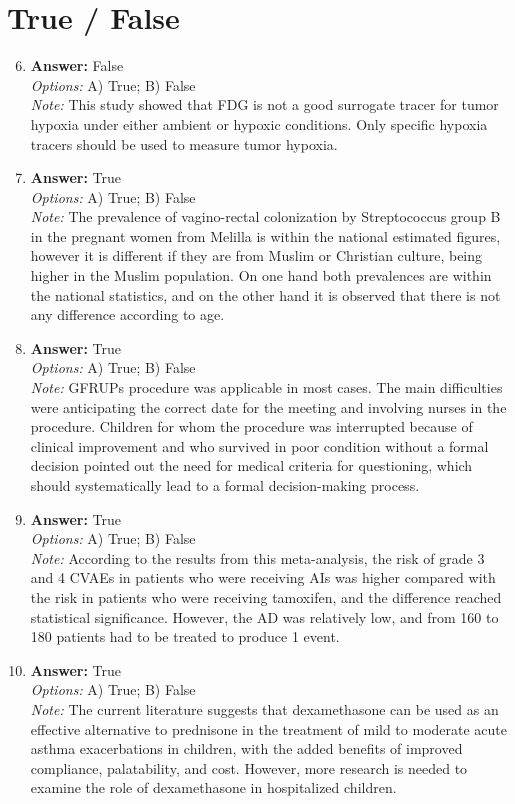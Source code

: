 \documentclass[12pt]{article}
\begin{document}
\section*{True / False}
\begin{enumerate}[label=\arabic*.]
\setcounter{enumi}{5}
\item \textbf{Answer:} False
\\ \textit{Options:} A) True; B) False
\\ \textit{Note:} This study showed that FDG is not a good surrogate tracer for tumor hypoxia under either ambient or hypoxic conditions. Only specific hypoxia tracers should be used to measure tumor hypoxia.
\item \textbf{Answer:} True
\\ \textit{Options:} A) True; B) False
\\ \textit{Note:} The prevalence of vagino-rectal colonization by Streptococcus group B in the pregnant women from Melilla is within the national estimated figures, however it is different if they are from Muslim or Christian culture, being higher in the Muslim population. On one hand both prevalences are within the national statistics, and on the other hand it is observed that there is not any difference according to age.
\item \textbf{Answer:} True
\\ \textit{Options:} A) True; B) False
\\ \textit{Note:} GFRUPs procedure was applicable in most cases. The main difficulties were anticipating the correct date for the meeting and involving nurses in the procedure. Children for whom the procedure was interrupted because of clinical improvement and who survived in poor condition without a formal decision pointed out the need for medical criteria for questioning, which should systematically lead to a formal decision-making process.
\item \textbf{Answer:} True
\\ \textit{Options:} A) True; B) False
\\ \textit{Note:} According to the results from this meta-analysis, the risk of grade 3 and 4 CVAEs in patients who were receiving AIs was higher compared with the risk in patients who were receiving tamoxifen, and the difference reached statistical significance. However, the AD was relatively low, and from 160 to 180 patients had to be treated to produce 1 event.
\item \textbf{Answer:} True
\\ \textit{Options:} A) True; B) False
\\ \textit{Note:} The current literature suggests that dexamethasone can be used as an effective alternative to prednisone in the treatment of mild to moderate acute asthma exacerbations in children, with the added benefits of improved compliance, palatability, and cost. However, more research is needed to examine the role of dexamethasone in hospitalized children.
\end{enumerate}
\end{document}
